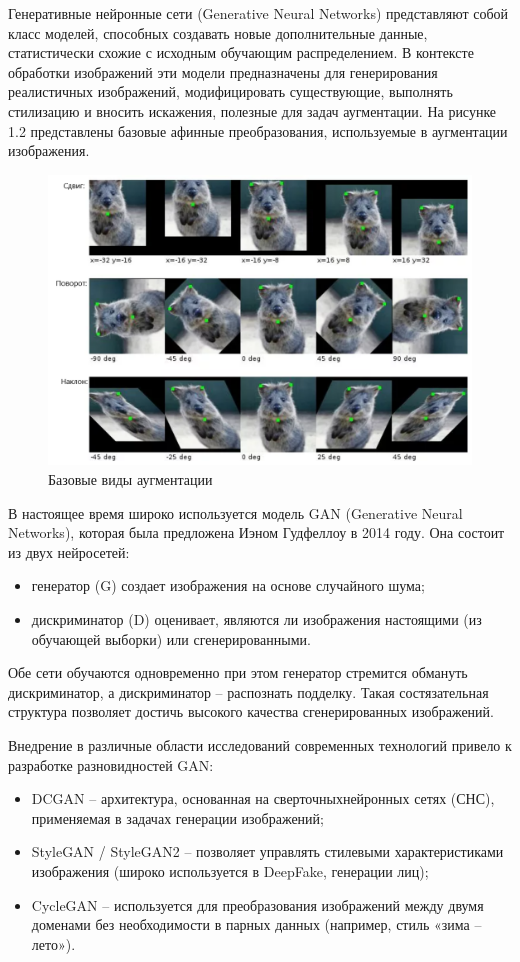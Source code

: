 Генеративные нейронные сети (Generative Neural Networks) представляют собой класс моделей, способных создавать новые дополнительные данные, статистически схожие с исходным обучающим распределением. В контексте обработки изображений эти модели предназначены для генерирования реалистичных изображений, модифицировать существующие, выполнять стилизацию и вносить искажения, полезные для задач аугментации. На рисунке 1.2 представлены базовые афинные преобразования, используемые в аугментации изображения.

\begin{figure}[H]
	\centering
	\includegraphics[width=1\linewidth]{images/augexample}
	\caption{Базовые виды аугментации}
	\label{fig:augexample}
\end{figure}


В настоящее время широко используется модель GAN (Generative Neural Networks), которая была предложена Иэном Гудфеллоу в 2014 году. Она состоит из двух нейросетей:

\begin{itemize}
	\item генератор (G) создает изображения на основе случайного шума;
	\item дискриминатор (D) оценивает, являются ли изображения настоящими (из обучающей выборки) или сгенерированными.
\end{itemize}

Обе сети обучаются одновременно при этом генератор стремится обмануть дискриминатор, а дискриминатор – распознать подделку. Такая состязательная структура позволяет достичь высокого качества сгенерированных изображений.

Внедрение в различные области исследований современных технологий привело к разработке разновидностей GAN:
\begin{itemize}
	\item DCGAN – архитектура, основанная на сверточныхнейронных сетях (СНС), применяемая в задачах генерации изображений;
	\item StyleGAN / StyleGAN2 – позволяет управлять стилевыми характеристиками изображения (широко используется в DeepFake, генерации лиц);
	\item CycleGAN – используется для преобразования изображений между двумя доменами без необходимости в парных данных (например, стиль «зима – лето»).
\end{itemize}


